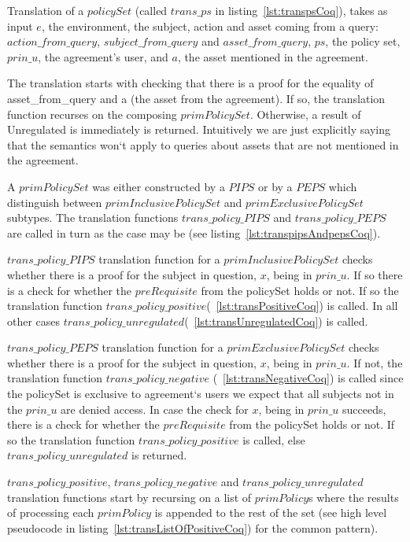 Translation of a $policySet$ (called $trans\_ps$ in listing~\ref{lst:transpsCoq}), takes as input $e$, the environment, the subject, action and asset coming from a query: $action\_from\_query$, $subject\_from\_query$ and $asset\_from\_query$, $ps$, the policy set, $prin\_{u}$, the agreement's user, and $a$, the asset mentioned in the agreement. 

The translation starts with checking that there is a proof for the equality of asset_from_query and a (the asset from the agreement). If so, the translation function recurses on the composing $primPolicySet$. Otherwise, a result of Unregulated is immediately is returned. Intuitively we are just explicitly saying that the semantics won`t apply to queries about assets that are not mentioned in the agreement. 

A $primPolicySet$ was either constructed by a $PIPS$ or by a $PEPS$ which distinguish between $primInclusivePolicySet$ and $primExclusivePolicySet$ subtypes. The translation functions $trans\_policy\_PIPS$ and $trans\_policy\_PEPS$ are called in turn as the case may be (see listing~\ref{lst:transpipsAndpepsCoq}).

$trans\_policy\_PIPS$ translation function for a $primInclusivePolicySet$ checks whether there is a proof for the subject in question, $x$, being in $prin\_u$. If so there is a check for whether the $preRequisite$ from the policySet holds or not. If so the translation function $trans\_policy\_positive$(~\ref{lst:transPositiveCoq}) is called. In all other cases $trans\_policy\_unregulated$(~\ref{lst:transUnregulatedCoq}) is called.

$trans\_policy\_PEPS$ translation function for a $primExclusivePolicySet$ checks whether there is a proof for the subject in question, $x$, being in $prin\_u$. If not, the translation function $trans\_policy\_negative$ (~\ref{lst:transNegativeCoq}) is called since the policySet is exclusive to agreement`s users we expect that all subjects not in the $prin\_u$ are denied access. In case the check for $x$, being in $prin\_u$ succeeds, there is a check for whether the $preRequisite$ from the policySet holds or not. If so the translation function $trans\_policy\_positive$ is called, else $trans\_policy\_unregulated$ is returned.

$trans\_policy\_positive$, $trans\_policy\_negative$ and $trans\_policy\_unregulated$ translation functions start by recursing on a list of $primPolicy$s where the results of processing each $primPolicy$ is appended to the rest of the set (see high level pseudocode in listing~\ref{lst:transListOfPositiveCoq}) for the common pattern). 

